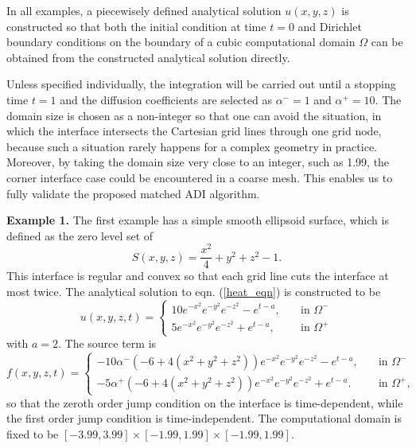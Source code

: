 \documentclass[dissertation]{uathesis}
\begin{document}
\begin{body}
In all examples, a piecewisely defined analytical solution $u(x,y,z)$ is constructed so that both the initial condition at time $t=0$ and Dirichlet boundary conditions on the boundary of a cubic computational domain $\Omega$ can be obtained from the constructed analytical solution directly.
 
Unless specified individually, the integration will be carried out until a stopping time $t=1$ and the diffusion coefficients are selected as $\alpha^{-}=1$ and $\alpha^{+}=10$. 
The domain size is chosen as a non-integer so that one can avoid the situation, in which
the interface intersects the Cartesian grid lines through one grid node,
because  such a situation rarely happens for a complex geometry in practice. 
Moreover, by taking the domain size very close to an integer, such as 1.99, 
the corner interface case could be encountered in a coarse mesh. 
This enables us to fully validate the proposed matched ADI algorithm.

{\flushleft \bf Example 1.} The first example has a simple smooth ellipsoid surface, which is defined as the zero level set of
% 
\begin{equation} \label{ellipsoid}
S(x,y,z) = \frac{x^{2}}{4} + y^{2} + z^{2} -1.
\end{equation}
%
This interface is regular and convex so that each grid line cuts the interface at most twice. The analytical solution to eqn. (\ref{heat_eqn}) is constructed to be
%
\begin{equation} \label{analytical_eqn_1}
u(x,y,z,t)= 
\begin{cases}
10e^{-x^{2}}e^{-y^{2}}e^{-z^{2}}-e^{t-a}, \quad   &\mbox{in } \Omega^{-} \\
5e^{-x^{2}}e^{-y^{2}}e^{-z^{2}}+e^{t-a},  \quad   &\mbox{in } \Omega^{+}
\end{cases}
\end{equation}
%
with $a=2$. The source term is
%
\begin{equation} \label{source_eqn_1}
f(x,y,z,t)= 
\begin{cases}
-10 \alpha^{-} (-6+4(x^{2}+y^{2}+z^{2})) e^{-x^{2}}e^{-y^{2}}e^{-z^{2}} - e^{t-a}, \quad   &\mbox{in } \Omega^{-} \\
-5 \alpha^{+} (-6+4(x^{2}+y^{2}+z^{2})) e^{-x^{2}}e^{-y^{2}}e^{-z^{2}} + e^{t-a}.  \quad   &\mbox{in } \Omega^{+},
\end{cases}
\end{equation}
%
so that the zeroth order jump condition on the interface is time-dependent, while the first order jump condition is time-independent. The computational domain is fixed to be  $[-3.99,3.99]\times[-1.99,1.99]\times[-1.99,1.99]$. 


\end{body}
\end{document}
